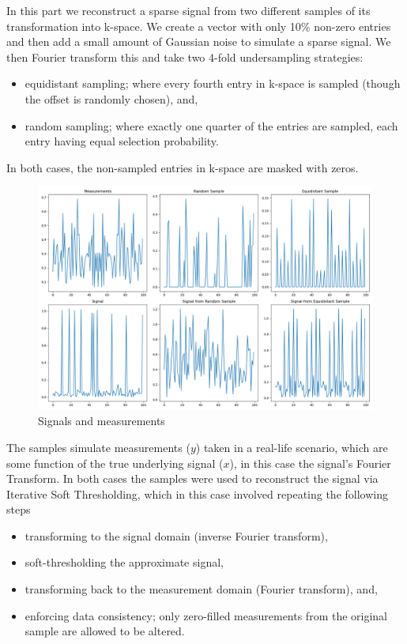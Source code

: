 \documentclass[12pt]{article}
\begin{document}
In this part we reconstruct a sparse signal from two different samples of its transformation into k-space.
We create a vector with only 10\% non-zero entries and then add a small amount of Gaussian noise to simulate a sparse signal.
We then Fourier transform this and take two 4-fold undersampling strategies:
\begin{itemize}
    \item equidistant sampling; where every fourth entry in k-space is sampled (though the offset is randomly chosen), and,
    \item random sampling; where exactly one quarter of the entries are sampled, each entry having equal selection probability.
\end{itemize}
In both cases, the non-sampled entries in k-space are masked with zeros.

\begin{figure}[hp]
    \includegraphics[scale=0.36]{figures/signal.png}
    \caption{Signals and measurements}
    \label{fig:signal}
\end{figure}

The samples simulate measurements ($y$) taken in a real-life scenario, which are some function of the true underlying signal ($x$),
in this case the signal's Fourier Transform.
In both cases the samples were used to reconstruct the signal via Iterative Soft Thresholding,
which in this case involved repeating the following steps
\begin{itemize}
    \item transforming to the signal domain (inverse Fourier transform),
    \item soft-thresholding the approximate signal,
    \item transforming back to the measurement domain (Fourier transform), and,
    \item enforcing data consistency; only zero-filled measurements from the original sample are allowed to be altered.
\end{itemize}
\end{document}
